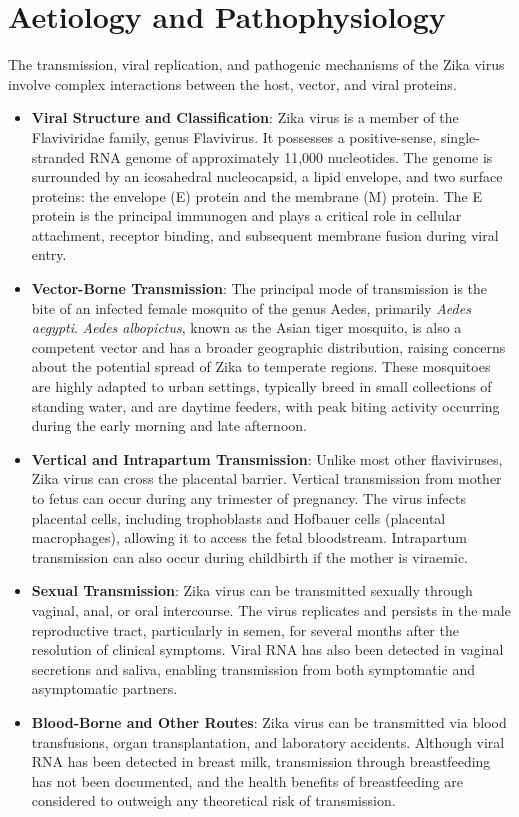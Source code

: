 \section*{Aetiology and Pathophysiology}
The transmission, viral replication, and pathogenic mechanisms of the Zika virus involve complex interactions between the host, vector, and viral proteins.
\begin{itemize}
\item \textbf{Viral Structure and Classification}: Zika virus is a member of the Flaviviridae family, genus Flavivirus. It possesses a positive-sense, single-stranded RNA genome of approximately 11,000 nucleotides. The genome is surrounded by an icosahedral nucleocapsid, a lipid envelope, and two surface proteins: the envelope (E) protein and the membrane (M) protein. The E protein is the principal immunogen and plays a critical role in cellular attachment, receptor binding, and subsequent membrane fusion during viral entry.
\item \textbf{Vector-Borne Transmission}: The principal mode of transmission is the bite of an infected female mosquito of the genus Aedes, primarily \textit{Aedes aegypti}. \textit{Aedes albopictus}, known as the Asian tiger mosquito, is also a competent vector and has a broader geographic distribution, raising concerns about the potential spread of Zika to temperate regions. These mosquitoes are highly adapted to urban settings, typically breed in small collections of standing water, and are daytime feeders, with peak biting activity occurring during the early morning and late afternoon.
\item \textbf{Vertical and Intrapartum Transmission}: Unlike most other flaviviruses, Zika virus can cross the placental barrier. Vertical transmission from mother to fetus can occur during any trimester of pregnancy. The virus infects placental cells, including trophoblasts and Hofbauer cells (placental macrophages), allowing it to access the fetal bloodstream. Intrapartum transmission can also occur during childbirth if the mother is viraemic.
\item \textbf{Sexual Transmission}: Zika virus can be transmitted sexually through vaginal, anal, or oral intercourse. The virus replicates and persists in the male reproductive tract, particularly in semen, for several months after the resolution of clinical symptoms. Viral RNA has also been detected in vaginal secretions and saliva, enabling transmission from both symptomatic and asymptomatic partners.
\item \textbf{Blood-Borne and Other Routes}: Zika virus can be transmitted via blood transfusions, organ transplantation, and laboratory accidents. Although viral RNA has been detected in breast milk, transmission through breastfeeding has not been documented, and the health benefits of breastfeeding are considered to outweigh any theoretical risk of transmission.

\end{itemize}
